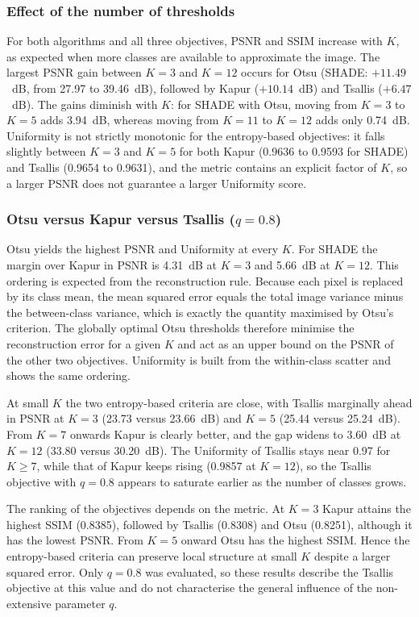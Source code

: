 \documentclass[review]{elsarticle}
\begin{document}
\subsubsection{Effect of the number of thresholds}

For both algorithms and all three objectives, PSNR and SSIM increase with
$K$, as expected when more classes are available to approximate the image. The
largest PSNR gain between $K=3$ and $K=12$ occurs for Otsu (SHADE: $+11.49$~dB,
from 27.97 to 39.46~dB), followed by Kapur ($+10.14$~dB) and Tsallis
($+6.47$~dB). The gains diminish with $K$: for SHADE with Otsu, moving from
$K=3$ to $K=5$ adds 3.94~dB, whereas moving from $K=11$ to $K=12$ adds only
0.74~dB. Uniformity is not strictly monotonic for the entropy-based
objectives: it falls slightly between $K=3$ and $K=5$ for both Kapur (0.9636
to 0.9593 for SHADE) and Tsallis (0.9654 to 0.9631), and the metric contains
an explicit factor of $K$, so a larger PSNR does not guarantee a larger
Uniformity score.

\subsubsection{Otsu versus Kapur versus Tsallis ($q=0.8$)}

 
Otsu yields the highest PSNR and Uniformity at every $K$. For SHADE the margin
over Kapur in PSNR is 4.31~dB at $K=3$ and 5.66~dB at $K=12$. This ordering is
expected from the reconstruction rule. Because each pixel is replaced by its
class mean, the mean squared error equals the total image variance minus the
between-class variance, which is exactly the quantity maximised by Otsu's
criterion. The globally optimal Otsu thresholds therefore minimise the
reconstruction error for a given $K$ and act as an upper bound on the PSNR of
the other two objectives. Uniformity is built from the within-class scatter
and shows the same ordering.

At small $K$ the two entropy-based criteria are close, with Tsallis marginally
ahead in PSNR at $K=3$ (23.73 versus 23.66~dB) and $K=5$ (25.44 versus
25.24~dB). From $K=7$ onwards Kapur is clearly better, and the gap widens to
3.60~dB at $K=12$ (33.80 versus 30.20~dB). The Uniformity of Tsallis stays
near 0.97 for $K\geq 7$, while that of Kapur keeps rising (0.9857 at $K=12$),
so the Tsallis objective with $q=0.8$ appears to saturate earlier as the
number of classes grows.

The ranking of the objectives depends on the metric. At $K=3$ Kapur attains
the highest SSIM (0.8385), followed by Tsallis (0.8308) and Otsu (0.8251),
although it has the lowest PSNR. From $K=5$ onward Otsu has the highest SSIM.
Hence the entropy-based criteria can preserve local structure at small $K$
despite a larger squared error. Only $q=0.8$ was evaluated, so these results
describe the Tsallis objective at this value and do not characterise the
general influence of the non-extensive parameter $q$.
\end{document}
